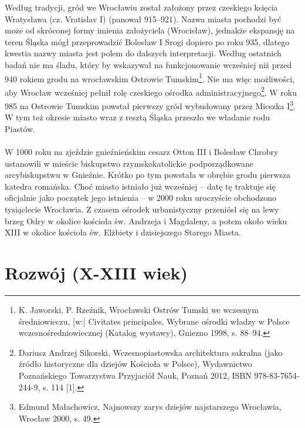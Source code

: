 \documentclass[12pt]{article}
\begin{document}
Według tradycji, gród we Wrocławiu został założony przez czeskiego księcia Wratysława (cz. Vratislav I) (panował 915–921). Nazwa miasta pochodzi być może od skróconej formy imienia założyciela (Wrocisław), jednakże ekspansję na teren Śląska mógł przeprowadzić Bolesław I Srogi dopiero po roku 935, dlatego kwestia nazwy miasta jest polem do dalszych interpretacji. Według ostatnich badań nie ma śladu, który by wskazywał na funkcjonowanie wcześniej niż przed 940 rokiem grodu na wrocławskim Ostrowie Tumskim\footnote{K. Jaworski, P. Rzeźnik, Wrocławski Ostrów Tumski we wczesnym średniowieczu, [w:] Civitates principales, Wybrane ośrodki władzy w Polsce wczesnośredniowiecznej (Katalog wystawy), Gniezno 1998, s. 88–94.}. Nie ma więc możliwości, aby Wrocław wcześniej pełnił rolę czeskiego ośrodka administracyjnego\footnote{Dariusz Andrzej Sikorski, Wczesnopiastowska architektura sakralna (jako źródło historyczne dla dziejów Kościoła w Polsce), Wydawnictwo Poznańskiego Towarzystwa Przyjaciół Nauk, Poznań 2012, ISBN 978-83-7654-244-9, s. 114 [1].}. W roku 985 na Ostrowie Tumskim powstał pierwszy gród wybudowany przez Mieszka I\footnote{Edmund Małachowicz, Najnowszy zarys dziejów najstarszego Wrocławia, Wrocław 2000, s. 49.}. W tym też okresie miasto wraz z resztą Śląska przeszło we władanie rodu Piastów.\\\\
W 1000 roku na zjeździe gnieźnieńskim cesarz Otton III i Bolesław Chrobry ustanowili w mieście biskupstwo rzymskokatolickie podporządkowane arcybiskupstwu w Gnieźnie. Krótko po tym powstała w obrębie grodu pierwsza katedra romańska. Choć miasto istniało już wcześniej – datę tę traktuje się oficjalnie jako początek jego istnienia – w 2000 roku uroczyście obchodzono tysiąclecie Wrocławia. Z czasem ośrodek urbanistyczny przeniósł się na lewy brzeg Odry w okolice kościoła św. Andrzeja i Magdaleny, a potem około wieku XIII w okolice kościoła św. Elżbiety i dzisiejszego Starego Miasta. 

\section{Rozwój (X-XIII wiek)}
\end{document}
